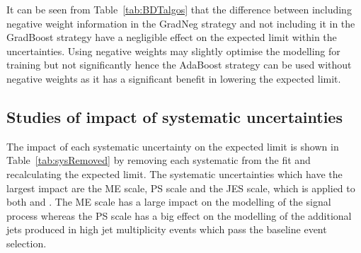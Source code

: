 It can be seen from Table~\ref{tab:BDTalgos} that the difference between including negative weight information in the GradNeg strategy and not including it in the GradBoost strategy have a negligible effect on the expected limit within the uncertainties. Using negative weights may slightly optimise the modelling for training but not significantly hence the AdaBoost strategy can be used without negative weights as it has a significant benefit in lowering the expected limit.


\subsection{Studies of impact of systematic uncertainties}

The impact of each systematic uncertainty on the expected limit is shown in Table~\ref{tab:sysRemoved} by removing each systematic from the fit and recalculating the expected limit. The systematic uncertainties which have the largest impact are the \ttbar ME scale, \ttbar PS scale and the JES scale, which is applied to both \ttbar and \tttt. The \ttbar ME scale has a large impact on the modelling of the signal process whereas the \ttbar PS scale has a big effect on the modelling of the additional jets produced in high jet multiplicity \ttbar events which pass the baseline event selection.

